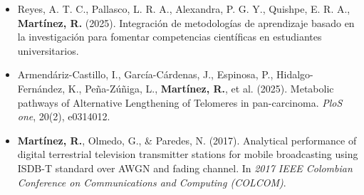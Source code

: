 \documentclass[11pt,a4paper]{article}
\begin{document}
\begin{itemize}
    \item Reyes, A. T. C., Pallasco, L. R. A., Alexandra, P. G. Y., Quishpe, E. R. A., \textbf{Martínez, R.} (2025). Integración de metodologías de aprendizaje basado en la investigación para fomentar competencias científicas en estudiantes universitarios.
    \item Armendáriz-Castillo, I., García-Cárdenas, J., Espinosa, P., Hidalgo-Fernández, K., Peña-Zúñiga, L., \textbf{Martínez, R.}, et al. (2025). Metabolic pathways of Alternative Lengthening of Telomeres in pan-carcinoma. \textit{PloS one}, 20(2), e0314012.
    \item \textbf{Martínez, R.}, Olmedo, G., \& Paredes, N. (2017). Analytical performance of digital terrestrial television transmitter stations for mobile broadcasting using ISDB-T standard over AWGN and fading channel. In \textit{2017 IEEE Colombian Conference on Communications and Computing (COLCOM)}.
\end{itemize}

\end{document}
